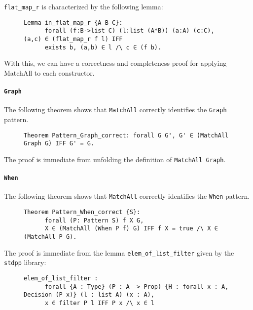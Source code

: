 \documentclass[11pt]{article}
\newcommand{\inlinecoq}[1]{\mbox{\lstinline[style=customcoq,columns=fixed,basewidth=.48em]{#1}}}
\newcommand{\ilc}[1]{\inlinecoq{#1}}
\begin{document}
\ilc{flat_map_r} is characterized by the following lemma:
\begin{figure}[h]
  \label{fig:in_flat_map_r}
  \begin{lstlisting}[style=customcoq,basicstyle=\small\ttfamily]
    Lemma in_flat_map_r {A B C}:
      forall (f:B->list C) (l:list (A*B)) (a:A) (c:C), (a,c) ∈ (flat_map_r f l) IFF
      exists b, (a,b) ∈ l /\ c ∈ (f b).
  \end{lstlisting}
\end{figure}

With this, we can have a correctness and completeness proof for applying MatchAll to each constructor.

\paragraph{\ilc{Graph}}

The following theorem shows that \ilc{MatchAll} correctly identifies the \ilc{Graph} pattern.

\begin{figure}[h]
  \label{fig:sem_graph}
  \begin{lstlisting}[style=customcoq,basicstyle=\small\ttfamily]
    Theorem Pattern_Graph_correct: forall G G', G' ∈ (MatchAll Graph G) IFF G' = G.
  \end{lstlisting}
\end{figure}

The proof is immediate from unfolding the definition of \ilc{MatchAll Graph}.

\paragraph{\ilc{When}}

The following theorem shows that \ilc{MatchAll} correctly identifies the \ilc{When} pattern.

\begin{figure}[H]
  \label{fig:sem_when}
  \begin{lstlisting}[style=customcoq,basicstyle=\small\ttfamily]
    Theorem Pattern_When_correct {S}:
      forall (P: Pattern S) f X G,
      X ∈ (MatchAll (When P f) G) IFF f X = true /\ X ∈ (MatchAll P G).
  \end{lstlisting}
\end{figure}

The proof is immediate from the lemma \ilc{elem_of_list_filter} given by the \ilc{stdpp} library:

\begin{figure}[H]
  \label{fig:list_filter}
  \begin{lstlisting}[style=customcoq,basicstyle=\small\ttfamily]
    elem_of_list_filter :
      forall {A : Type} (P : A -> Prop) {H : forall x : A, Decision (P x)} (l : list A) (x : A),
      x ∈ filter P l IFF P x /\ x ∈ l
  \end{lstlisting}
\end{figure}
\end{document}
